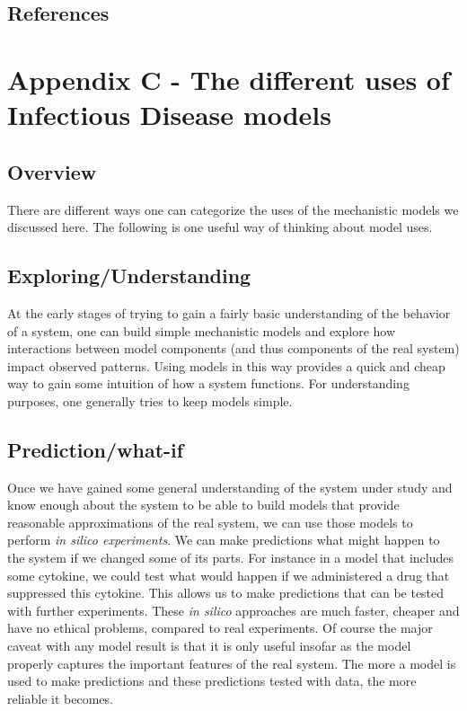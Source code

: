 \documentclass[
]{book}
\begin{document}
\hypertarget{references-20}{%
\section{References}\label{references-20}}

\hypertarget{appendix-c---the-different-uses-of-infectious-disease-models}{%
\chapter{Appendix C - The different uses of Infectious Disease models}\label{appendix-c---the-different-uses-of-infectious-disease-models}}

\hypertarget{overview-1}{%
\section{Overview}\label{overview-1}}

There are different ways one can categorize the uses of the mechanistic models we discussed here. The following is one useful way of thinking about model uses.

\hypertarget{exploringunderstanding}{%
\section{Exploring/Understanding}\label{exploringunderstanding}}

At the early stages of trying to gain a fairly basic understanding of the behavior of a system, one can build simple mechanistic models and explore how interactions between model components (and thus components of the real system) impact observed patterns. Using models in this way provides a quick and cheap way to gain some intuition of how a system functions. For understanding purposes, one generally tries to keep models simple.

\hypertarget{predictionwhat-if}{%
\section{Prediction/what-if}\label{predictionwhat-if}}

Once we have gained some general understanding of the system under study and know enough about the system to be able to build models that provide reasonable approximations of the real system, we can use those models to perform \emph{in silico experiments}. We can make predictions what might happen to the system if we changed some of its parts. For instance in a model that includes some cytokine, we could test what would happen if we administered a drug that suppressed this cytokine. This allows us to make predictions that can be tested with further experiments. These \emph{in silico} approaches are much faster, cheaper and have no ethical problems, compared to real experiments. Of course the major caveat with any model result is that it is only useful insofar as the model properly captures the important features of the real system. The more a model is used to make predictions and these predictions tested with data, the more reliable it becomes.
\end{document}
